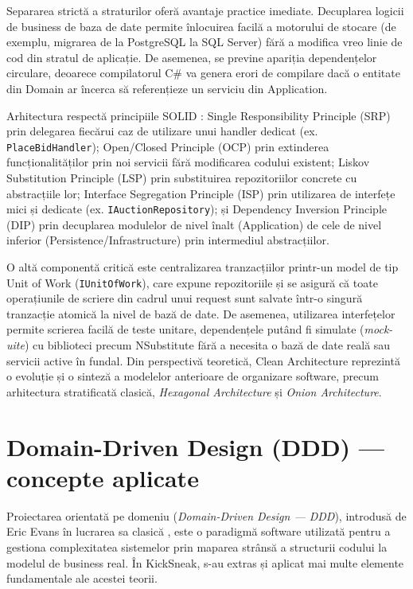 Separarea strictă a straturilor oferă avantaje practice imediate. Decuplarea logicii de business de baza de date permite înlocuirea facilă a motorului de stocare (de exemplu, migrarea de la PostgreSQL la SQL Server) fără a modifica vreo linie de cod din stratul de aplicație. De asemenea, se previne apariția dependențelor circulare, deoarece compilatorul C\# va genera erori de compilare dacă o entitate din Domain ar încerca să referențieze un serviciu din Application.

Arhitectura respectă principiile SOLID \cite{martin2017clean}: Single Responsibility Principle (SRP) prin delegarea fiecărui caz de utilizare unui handler dedicat (ex. \texttt{PlaceBidHandler}); Open/Closed Principle (OCP) prin extinderea funcționalităților prin noi servicii fără modificarea codului existent; Liskov Substitution Principle (LSP) prin substituirea repozitoriilor concrete cu abstracțiile lor; Interface Segregation Principle (ISP) prin utilizarea de interfețe mici și dedicate (ex. \texttt{IAuctionRepository}); și Dependency Inversion Principle (DIP) prin decuplarea modulelor de nivel înalt (Application) de cele de nivel inferior (Persistence/Infrastructure) prin intermediul abstracțiilor.

O altă componentă critică este centralizarea tranzacțiilor printr-un model de tip Unit of Work (\texttt{IUnitOfWork}), care expune repozitoriile și se asigură că toate operațiunile de scriere din cadrul unui request sunt salvate într-o singură tranzacție atomică la nivel de bază de date. De asemenea, utilizarea interfețelor permite scrierea facilă de teste unitare, dependențele putând fi simulate (\textit{mock-uite}) cu biblioteci precum NSubstitute fără a necesita o bază de date reală sau servicii active în fundal. Din perspectivă teoretică, Clean Architecture reprezintă o evoluție și o sinteză a modelelor anterioare de organizare software, precum arhitectura stratificată clasică, \textit{Hexagonal Architecture} și \textit{Onion Architecture}.

\section{Domain-Driven Design (DDD) --- concepte aplicate}

Proiectarea orientată pe domeniu (\textit{Domain-Driven Design --- DDD}), introdusă de Eric Evans în lucrarea sa clasică \cite{evans2003ddd}, este o paradigmă software utilizată pentru a gestiona complexitatea sistemelor prin maparea strânsă a structurii codului la modelul de business real. În KickSneak, s-au extras și aplicat mai multe elemente fundamentale ale acestei teorii.


